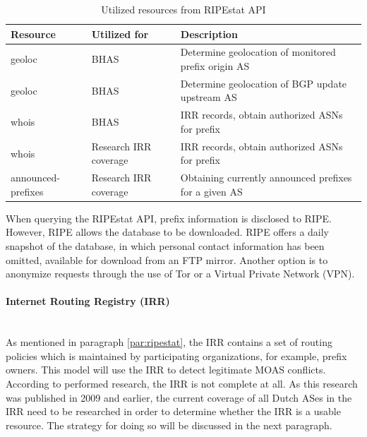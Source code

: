\begin{table}[h]
        \centering
        \begin{tabular}{|p{2cm}|p{4cm}|p{5cm}|}\hline
                \textbf{Resource} & \textbf{Utilized for} & \textbf{Description}  \\ \hline
                geoloc & BHAS & Determine geolocation of monitored prefix origin AS \\ \hline
                geoloc & BHAS & Determine geolocation of BGP update upstream AS \\ \hline
                whois & BHAS & IRR records, obtain authorized ASNs for prefix \\ \hline
                whois & Research IRR coverage & IRR records, obtain authorized ASNs for prefix \\ \hline
                announced-prefixes & Research IRR coverage & Obtaining currently announced prefixes for a given AS \\ \hline
        \end{tabular}
        \caption{Utilized resources from RIPEstat API}
        \label{table:ripestaturis}
\end{table}

When querying the RIPEstat API, prefix information is disclosed to RIPE. However, RIPE allows the database to be downloaded. RIPE offers a daily snapshot of the database, in which personal contact information has been omitted, available for download from an FTP mirror\cite{downloadripedb}. Another option is to anonymize requests through the use of Tor or a Virtual Private Network (VPN).

\paragraph{Internet Routing Registry (IRR)}\label{par:irr}\mbox{}\\
As mentioned in paragraph \ref{par:ripestat}, the IRR contains a set of routing policies which is maintained by participating organizations, for example, prefix owners. This model will use the IRR to detect legitimate MOAS conflicts. According to performed research\cite{routehygiene, irraccuracy, battista2006extractbgp}, the IRR is not complete at all. As this research was published in 2009 and earlier, the current coverage of all Dutch ASes in the IRR need to be researched in order to determine whether the IRR is a usable resource. The strategy for doing so will be discussed in the next paragraph.
\newpage
